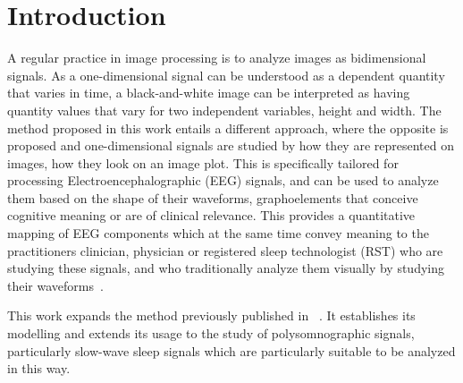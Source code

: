 \documentclass[review]{elsarticle}
\begin{document}
\linenumbers

\section{Introduction}

A regular practice in image processing is to analyze images as bidimensional signals.  As a one-dimensional signal can be understood as a dependent quantity that varies in time,  a black-and-white image can be interpreted as having quantity values that vary for two independent variables, height and width. The method proposed in this work entails a different approach, where the opposite is proposed and one-dimensional signals are studied by how they are represented on images, how they look on an image plot.  This is specifically tailored for processing Electroencephalographic 
(EEG) signals, and can be used to analyze them based on the shape of their waveforms, graphoelements that conceive cognitive meaning or are of clinical relevance.  This provides a quantitative mapping of EEG components which at the same time convey meaning to the practitioners clinician, physician or registered sleep technologist (RST) who are studying these signals, and who traditionally analyze them visually by studying their waveforms~\cite{Cole2017,Rodenbeck2006,Schomer2010}.

This work expands the method previously published in ~\citep{Ramele2016, Ramele2018, Ramele2019}.  It establishes its modelling and extends its usage to the study of polysomnographic signals, particularly slow-wave sleep signals which are particularly suitable to be analyzed in this way.
\end{document}
